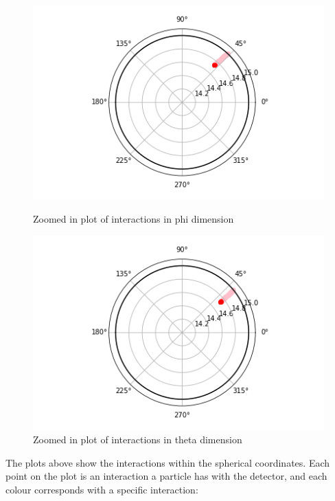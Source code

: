 \documentclass[a4paper]{article}
\begin{document}
\begin{figure}[H]
\begin{minipage}[b]{0.5\linewidth}
  \end{minipage} 
  \begin{minipage}[b]{0.5\linewidth}
    \centering
    \includegraphics[width=1\linewidth]{id 26218/achinos_26218_phi.png} 
    \caption{Zoomed in plot of interactions in phi dimension} 
    \vspace{4ex}
  \end{minipage}%
  \begin{minipage}[b]{0.5\linewidth}
    \centering
    \includegraphics[width=1\linewidth]{id 26218/achinos_26218_theta.png} 
    \caption{Zoomed in plot of interactions in theta dimension} 
    \vspace{4ex}
  \end{minipage} 
\end{figure}
\noindent The plots above show the interactions within the spherical coordinates. Each point on the plot is an interaction a particle has with the detector, and each colour corresponds with a specific interaction:
\end{document}
